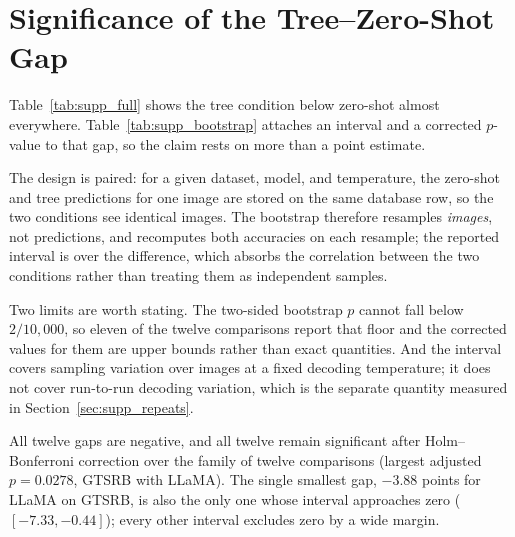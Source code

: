 \documentclass[10pt,twocolumn,letterpaper]{article}
\begin{document}
\section{Significance of the Tree--Zero-Shot Gap}
\label{sec:supp_stats}

Table~\ref{tab:supp_full} shows the tree condition below zero-shot almost
everywhere. Table~\ref{tab:supp_bootstrap} attaches an interval and a
corrected $p$-value to that gap, so the claim rests on more than a point
estimate.

The design is paired: for a given dataset, model, and temperature, the
zero-shot and tree predictions for one image are stored on the same database
row, so the two conditions see identical images. The bootstrap therefore
resamples \emph{images}, not predictions, and recomputes both accuracies on
each resample; the reported interval is over the difference, which absorbs the
correlation between the two conditions rather than treating them as
independent samples.

Two limits are worth stating. The two-sided bootstrap $p$ cannot fall below
$2/10{,}000$, so eleven of the twelve comparisons report that floor and the
corrected values for them are upper bounds rather than exact
quantities. And the interval covers sampling variation over images at a fixed
decoding temperature; it does not cover run-to-run decoding variation, which is
the separate quantity measured in Section~\ref{sec:supp_repeats}.

All twelve gaps are negative, and all twelve remain significant after
Holm--Bonferroni correction over the family of twelve comparisons (largest
adjusted $p=0.0278$, GTSRB with LLaMA). The single smallest gap,
$-3.88$ points for LLaMA on GTSRB, is also the only one whose interval
approaches zero ($[-7.33, -0.44]$); every other interval excludes zero by a
wide margin.
\end{document}

